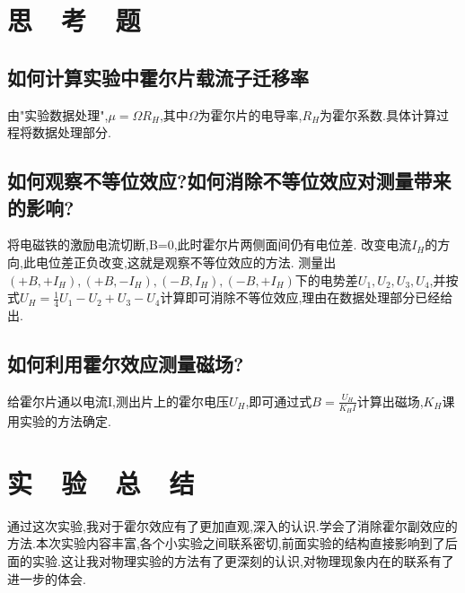 \documentclass{thuemp}
\begin{document}
\section{思~~考~~题}

\subsection{如何计算实验中霍尔片载流子迁移率}
由"实验数据处理",$\mu=\Omega R_{H}$,其中$\Omega$为霍尔片的电导率,$R_{H}$为霍尔系数.具体计算过程将数据处理部分.
\subsection{如何观察不等位效应?如何消除不等位效应对测量带来的影响?}
将电磁铁的激励电流切断,B=0,此时霍尔片两侧面间仍有电位差.
改变电流$I_{H}$的方向,此电位差正负改变,这就是观察不等位效应的方法.
测量出$(+B,+I_{H}),(+B,-I_{H}),(-B,I_{H}),(-B,+I_{H})$下的电势差$U_{1},U_{2},U_{3},U_{4}$,并按式$U_{H}=\frac{1}{4}U_{1}-U_{2}+U_{3}-U_{4}$计算即可消除不等位效应,理由在数据处理部分已经给出.
\subsection{如何利用霍尔效应测量磁场?}
给霍尔片通以电流I,测出片上的霍尔电压$U_{H}$,即可通过式$ B=\frac{U_{H}}{K_{H}I} $计算出磁场,$K_{H}$课用实验的方法确定.
\section{实~~验~~总~~结}
通过这次实验,我对于霍尔效应有了更加直观,深入的认识.学会了消除霍尔副效应的方法.本次实验内容丰富,各个小实验之间联系密切,前面实验的结构直接影响到了后面的实验.这让我对物理实验的方法有了更深刻的认识,对物理现象内在的联系有了进一步的体会.
\end{document}
